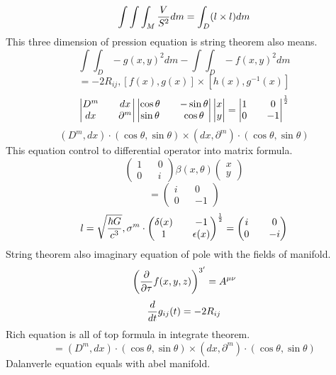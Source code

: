 \documentclass{jsarticle}
\begin{document}
   $$ \int \int \int_M{V \over S^2}dm = \int_D(l \times l)dm $$
   This three dimension of pression equation is string theorem also means.
   $$ \int \int_D - g(x,y)^2dm - \int \int_D -f(x,y)^2dm $$
   $$ = - 2 R_{ij}, [f(x),g(x)] \times [h(x),g^{-1}(x)] $$
   $$ \begin{vmatrix} D^m && dx \\
   dx && \partial^m \end{vmatrix} \begin{vmatrix} \cos \theta && - \sin \theta \\
   \sin \theta && \cos \theta \end{vmatrix} \begin{vmatrix} x \\
   y \end{vmatrix} = \begin{vmatrix} 1 && 0 \\
   0 && - 1 \end{vmatrix}^{1 \over 2} $$
   $$ (D^m,dx)\cdot (\cos \theta, \sin \theta) \times (dx, \partial^m)\cdot (\cos \theta, \sin \theta) $$
   This equation control to differential operator into matrix formula.
   $$ \begin{pmatrix} 1 && 0 \\
   0 && i \end{pmatrix} \beta(x,\theta) \begin{pmatrix} x \\
   y \end{pmatrix} $$
   $$ = \begin{pmatrix} i && 0 \\
   0 && - 1 \end{pmatrix} $$
   $$ l = {\sqrt{\hbar G \over c^3}}, \sigma^m \cdot \begin{pmatrix} \delta(x) && - 1 \\
   1 && \epsilon (x) \end{pmatrix}^{1 \over 2} = \begin{pmatrix} i && 0 \\
   0 && - i \end{pmatrix} $$
   String theorem also imaginary equation of pole with the fields of manifold.
   $$ \left({\partial \over \partial \tau}f(x,y,z)\right)^{3'} = A^{\mu\nu} $$
   $$ {d \over dt}g_{ij}(t) = - 2 R_{ij} $$
   Rich equation is all of top formula in integrate theorem.
      $$ = (D^m,dx) \cdot (\cos \theta, \sin \theta) \times (dx, \partial^m)\cdot (\cos \theta, \sin \theta) $$
      Dalanverle equation equals with abel manifold.
\end{document}
